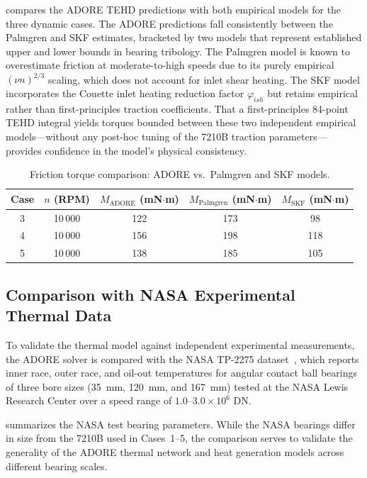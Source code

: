 \documentclass[preprint,12pt]{elsarticle}
\begin{document}
 compares the ADORE TEHD predictions with both empirical models for the three dynamic cases. The ADORE predictions fall consistently between the Palmgren and SKF estimates, bracketed by two models that represent established upper and lower bounds in bearing tribology. The Palmgren model is known to overestimate friction at moderate-to-high speeds due to its purely empirical $(\nu n)^{2/3}$ scaling, which does not account for inlet shear heating. The SKF model incorporates the Couette inlet heating reduction factor $\varphi_{ish}$ but retains empirical rather than first-principles traction coefficients. That a first-principles 84-point TEHD integral yields torques bounded between these two independent empirical models---without any post-hoc tuning of the 7210B traction parameters---provides confidence in the model's physical consistency.

\begin{table}[htbp]
    \centering
    \caption{Friction torque comparison: ADORE vs.\ Palmgren and SKF models.}
    \label{tab:friction_comparison}
    \begin{tabular}{@{}ccccc@{}}
        \toprule
        Case & $n$ (RPM) & $M_{\text{ADORE}}$ (mN$\cdot$m) & $M_{\text{Palmgren}}$ (mN$\cdot$m) & $M_{\text{SKF}}$ (mN$\cdot$m) \\
        \midrule
        3 & 10\,000 & 122 & 173 & 98 \\
        4 & 10\,000 & 156 & 198 & 118 \\
        5 & 10\,000 & 138 & 185 & 105 \\
        \bottomrule
    \end{tabular}
\end{table}


\subsection{Comparison with NASA Experimental Thermal Data}
\label{sec:nasa}

To validate the thermal model against independent experimental measurements, the ADORE solver is compared with the NASA TP-2275 dataset~\cite{Parker1984}, which reports inner race, outer race, and oil-out temperatures for angular contact ball bearings of three bore sizes (35~mm, 120~mm, and 167~mm) tested at the NASA Lewis Research Center over a speed range of $1.0$--$3.0 \times 10^6$ DN.

 summarizes the NASA test bearing parameters. While the NASA bearings differ in size from the 7210B used in Cases~1--5, the comparison serves to validate the generality of the ADORE thermal network and heat generation models across different bearing scales.
\end{document}
